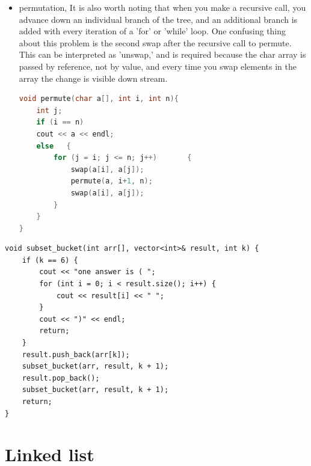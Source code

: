 \documentclass[a4paper,11pt,twoside]{book}
\begin{document}
\begin{itemize}
	\item permutation, It is also worth noting that when you make a recursive call, you advance down an individual branch of the tree, and an additional branch is added with every iteration of a 'for' or 'while' loop. One confusing thing about this problem is the second swap after the recursive call to permute. This can be interpreted as 'unswap,' and is required because the char array is passed by reference, not by value, and every time you swap elements in the array the change is visible down stream.

\begin{lstlisting}[frame=single, language=c++]
void permute(char a[], int i, int n){
	int j;
	if (i == n)
	cout << a << endl;
	else   {
		for (j = i; j <= n; j++)       {
			swap(a[i], a[j]);          
			permute(a, i+1, n);
			swap(a[i], a[j]);
		}
	}
} 	
\end{lstlisting}

\end{itemize}

\begin{lstlisting}
void subset_bucket(int arr[], vector<int>& result, int k) {
	if (k == 6) {
		cout << "one answer is ( ";
		for (int i = 0; i < result.size(); i++) {
			cout << result[i] << " ";
		}
		cout << ")" << endl;
		return;
	}
	result.push_back(arr[k]);
	subset_bucket(arr, result, k + 1);
	result.pop_back();
	subset_bucket(arr, result, k + 1);
	return;
}
\end{lstlisting}

%		




\section{Linked list}
\end{document}
